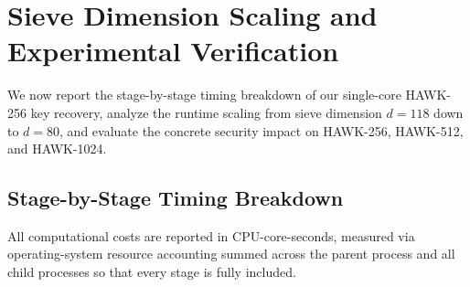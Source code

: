 \documentclass[11pt,a4paper]{article}
\theoremstyle{definition}
\begin{document}
\section{Sieve Dimension Scaling and Experimental Verification}
\label{sec:experiments}

We now report the stage-by-stage timing breakdown of our single-core HAWK-256 key recovery, analyze the runtime scaling from sieve dimension $d=118$ down to $d=80$, and evaluate the concrete security impact on HAWK-256, HAWK-512, and HAWK-1024.

\subsection{Stage-by-Stage Timing Breakdown}
All computational costs are reported in CPU-core-seconds, measured via operating-system resource accounting summed across the parent process and all child processes so that every stage is fully included.
\end{document}
